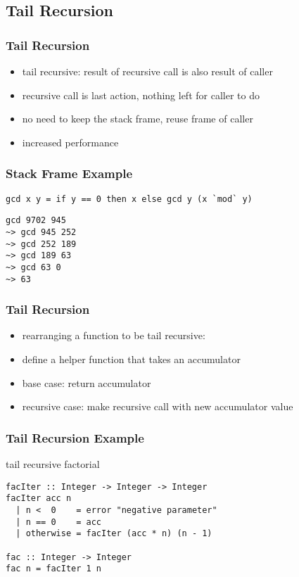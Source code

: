 \documentclass[dvipsnames]{beamer}
\theoremstyle{plain}
\begin{document}
\subsection{Tail Recursion}

\begin{frame}
  \frametitle{Tail Recursion}

  \begin{itemize}
    \item \alert{tail recursive}: result of recursive call is also result of caller
    \item recursive call is last action, nothing left for caller to do

    \pause
    \bigskip
    \item no need to keep the stack frame, reuse frame of caller
    \item increased performance
  \end{itemize}
\end{frame}

\begin{frame}[fragile]
  \frametitle{Stack Frame Example}

  \begin{exampleblock}{}
    \begin{lstlisting}
gcd x y = if y == 0 then x else gcd y (x `mod` y)
    \end{lstlisting}

    \begin{lstlisting}[frame=single]
gcd 9702 945
~> gcd 945 252
~> gcd 252 189
~> gcd 189 63
~> gcd 63 0
~> 63
    \end{lstlisting}
  \end{exampleblock}
\end{frame}

\begin{frame}
  \frametitle{Tail Recursion}

  \begin{itemize}
    \item rearranging a function to be tail recursive:

    \medskip
    \item define a helper function that takes an accumulator
    \item base case: return accumulator
    \item recursive case: make recursive call with new accumulator value
  \end{itemize}
\end{frame}

\begin{frame}[fragile]
  \frametitle{Tail Recursion Example}

  \begin{exampleblock}{tail recursive factorial}
    \begin{lstlisting}
facIter :: Integer -> Integer -> Integer
facIter acc n
  | n <  0    = error "negative parameter"
  | n == 0    = acc
  | otherwise = facIter (acc * n) (n - 1)

fac :: Integer -> Integer
fac n = facIter 1 n
    \end{lstlisting}
  \end{exampleblock}
\end{frame}
\end{document}

